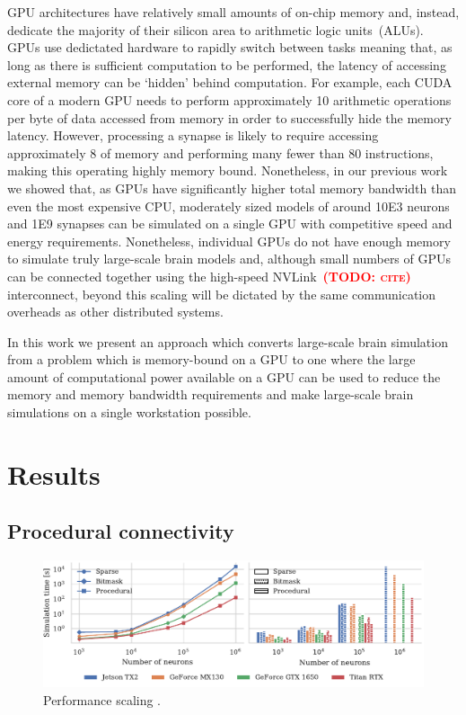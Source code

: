 \documentclass[9pt,twocolumn,twoside,lineno]{pnas-new}
\newcommand{\todo}[1]{\textbf{\textsc{\textcolor{red}{(TODO: #1)}}}}
\begin{document}
GPU architectures have relatively small amounts of on-chip memory and, instead, dedicate the majority of their silicon area to arithmetic logic units~(ALUs).
GPUs use dedictated hardware to rapidly switch between tasks meaning that, as long as there is sufficient computation to be performed, the latency of accessing external memory can be `hidden' behind computation.
For example, each CUDA core of a modern GPU needs to perform approximately 10 arithmetic operations per byte of data accessed from memory in order to successfully hide the memory latency.
However, processing a synapse is likely to require accessing approximately \SI{8}{\byte} of memory and performing many fewer than 80 instructions, making this operating highly memory bound.
Nonetheless, in our previous work~\citep{Knight2018} we showed that, as GPUs have significantly higher total memory bandwidth than even the most expensive CPU, moderately sized models of around \num{10E3} neurons and \num{1E9} synapses can be simulated on a single GPU with competitive speed and energy requirements.
Nonetheless, individual GPUs do not have enough memory to simulate truly large-scale brain models and, although small numbers of GPUs can be connected together using the high-speed NVLink~\todo{cite} interconnect, beyond this scaling will be dictated by the same communication overheads as other distributed systems.

In this work we present an approach which converts large-scale brain simulation from a problem which is memory-bound on a GPU to one where the large amount of computational power available on a GPU can be used to reduce the memory and memory bandwidth requirements and make large-scale brain simulations on a single workstation possible.

\section*{Results}
\subsection*{Procedural connectivity}
\begin{figure}
     \centering
    \includegraphics{figures/performance_scaling}
    \caption{Performance scaling .}
    \label{fig:performance_scaling}
\end{figure}
\end{document}
